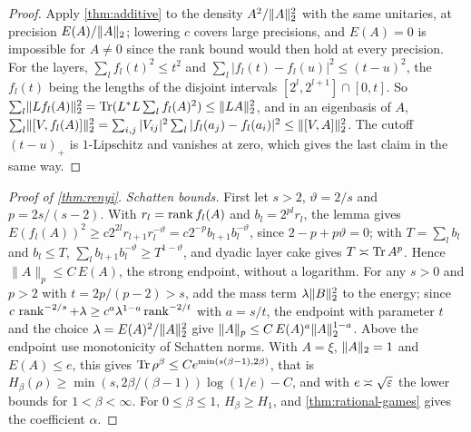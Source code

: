 \begin{proof}
Apply \cref{thm:additive} to the density $A^2/\lVert A\rVert_2^2$ with the same unitaries, at precision $E(A)/\lVert A\rVert_2$; lowering $c$
covers large precisions, and $E(A)=0$ is impossible for $A\ne0$ since the rank bound would then hold at every precision. For
the layers, $\sum_lf_l(t)^2\le t^2$ and $\sum_l|f_l(t)-f_l(u)|^2\le(t-u)^2$, the $f_l(t)$ being the lengths of the disjoint
intervals $[2^l,2^{l+1}]\cap[0,t]$. So $\sum_l\lVert Lf_l(A)\rVert_2^2=\operatorname{Tr}(L^*L\sum_lf_l(A)^2)\le\lVert LA\rVert_2^2$, and in an eigenbasis of $A$,
$\sum_l\lVert [V,f_l(A)]\rVert_2^2=\sum_{i,j}|V_{ij}|^2\sum_l|f_l(a_j)-f_l(a_i)|^2\le\lVert [V,A]\rVert_2^2$. The cutoff $(t-u)_+$ is $1$-Lipschitz and
vanishes at zero, which gives the last claim in the same way.
\end{proof}

\begin{proof}[Proof of \cref{thm:renyi}]
\emph{Schatten bounds.} First let $s>2$, $\vartheta=2/s$ and $p=2s/(s-2)$. With $r_l=\operatorname{rank} f_l(A)$ and $b_l=2^{pl}r_l$, the lemma gives
$E(f_l(A))^2\ge c2^{2l}r_{l+1}r_l^{-\vartheta}=c2^{-p}b_{l+1}b_l^{-\vartheta}$, since $2-p+p\vartheta=0$; with $T=\sum_lb_l$ and $b_l\le T$,
$\sum_lb_{l+1}b_l^{-\vartheta}\ge T^{1-\vartheta}$, and dyadic layer cake gives $T\asymp\operatorname{Tr} A^p$. Hence $\|A\|_p\le C\,E(A)$, the strong
endpoint, without a logarithm. For any $s>0$ and $p>2$ with $t=2p/(p-2)>s$, add the mass term $\lambda\lVert B\rVert_2^2$ to the energy;
since $c\,\operatorname{rank}^{-2/s}+\lambda\ge c^a\lambda^{1-a}\operatorname{rank}^{-2/t}$ with $a=s/t$, the endpoint with parameter $t$ and the choice
$\lambda=E(A)^2/\lVert A\rVert_2^2$ give $\|A\|_p\le C\,E(A)^a\lVert A\rVert_2^{1-a}$. Above the endpoint use monotonicity of Schatten norms. With
$A=\xi$, $\lVert A\rVert_2=1$ and $E(A)\le e$, this gives $\operatorname{Tr}\rho^\beta\le Ce^{\min(s(\beta-1),2\beta)}$, that is
$H_\beta(\rho)\ge\min(s,2\beta/(\beta-1))\log(1/e)-C$, and with $e\asymp\sqrt{\varepsilon}$ the lower bounds for $1<\beta<\infty$. For
$0\le\beta\le1$, $H_\beta\ge H_1$, and \cref{thm:rational-games} gives the coefficient $\alpha$.


\end{proof}
